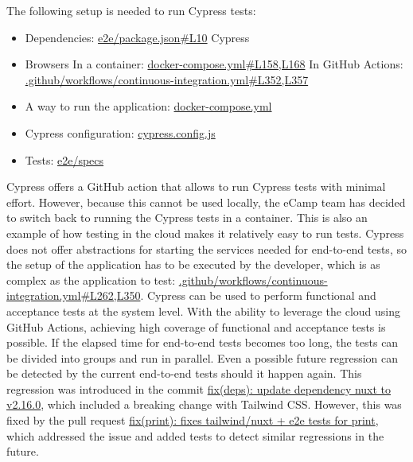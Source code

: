 \documentclass[conference]{IEEEtran}
\begin{document}
The following setup is needed to run Cypress tests:
\begin{itemize}
	\item Dependencies: \href{https://github.com/ecamp/ecamp3/blob/7a1cf92e3eee27b0b942fcd87bd8ce5c221089b7/e2e/package.json#L10}{e2e/package.json\#L10}
	      \subitem Cypress
	\item Browsers
	      \subitem In a container: \href{https://github.com/ecamp/ecamp3/blob/7a1cf92e3eee27b0b942fcd87bd8ce5c221089b7/docker-compose.yml#L158,L168}{docker-compose.yml\#L158,L168}
	      \subitem In GitHub Actions: \href{https://github.com/ecamp/ecamp3/blob/7a1cf92e3eee27b0b942fcd87bd8ce5c221089b7/.github/workflows/continuous-integration.yml#L352,L357}{.github/workflows/continuous-integration.yml\#L352,L357}
	\item A way to run the application: \href{https://github.com/ecamp/ecamp3/blob/7a1cf92e3eee27b0b942fcd87bd8ce5c221089b7/docker-compose.yml}{docker-compose.yml}
	\item Cypress configuration: \href{https://github.com/ecamp/ecamp3/blob/7a1cf92e3eee27b0b942fcd87bd8ce5c221089b7/e2e/cypress.config.js}{cypress.config.js}
	\item Tests: \href{https://github.com/ecamp/ecamp3/tree/7a1cf92e3eee27b0b942fcd87bd8ce5c221089b7/e2e/specs}{e2e/specs}
\end{itemize}
Cypress offers a GitHub action that allows to run Cypress tests with minimal effort.
However, because this cannot be used locally, the eCamp team has decided to switch back to running the Cypress tests in
a container\cite{ecamp3-e2e-tests-in-container}.
This is also an example of how testing in the cloud makes it relatively easy to run tests.
Cypress does not offer abstractions for starting the services needed for end-to-end tests\cite{cypress-website-best-practice-web-servers},
so the setup of the application has to be executed by the developer, which is as complex as the application to test: \href{https://github.com/ecamp/ecamp3/blob/7a1cf92e3eee27b0b942fcd87bd8ce5c221089b7/.github/workflows/continuous-integration.yml#L262,L350}{.github/workflows/continuous-integration.yml\#L262,L350}.
\newline
Cypress can be used to perform functional and acceptance tests at the system level.
With the ability to leverage the cloud using GitHub Actions, achieving high coverage of functional and acceptance tests is possible.
If the elapsed time for end-to-end tests becomes too long, the tests can be divided into groups and run in parallel.
Even a possible future regression can be detected by the current end-to-end tests should it happen again.
This regression was introduced in the commit \href{https://github.com/ecamp/ecamp3/commit/55c728e5b543a920a97988882df2ea99136228ea}{fix(deps): update dependency nuxt to v2.16.0},
which included a breaking change with Tailwind CSS\@.
However, this was fixed by the pull request \href{https://github.com/ecamp/ecamp3/pull/3275}{fix(print): fixes tailwind/nuxt + e2e tests for print},
which addressed the issue and added tests to detect similar regressions in the future.
\end{document}
